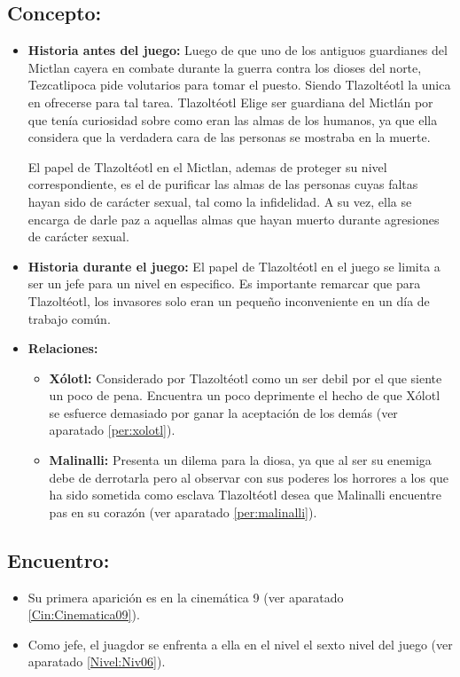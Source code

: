 \subsection{Concepto:}
\begin{itemize}
	\item \textbf{Historia antes del juego:}
	Luego de que uno de los antiguos guardianes del Mictlan cayera en combate durante la guerra contra los dioses del norte, Tezcatlipoca pide volutarios para tomar el puesto. Siendo Tlazoltéotl la unica en ofrecerse para tal tarea. Tlazoltéotl Elige ser guardiana del Mictlán por que tenía curiosidad sobre como eran las almas de los humanos, ya que ella considera que la verdadera cara de las personas se mostraba en la muerte.
	\\
	\par
	El papel de Tlazoltéotl en el Mictlan, ademas de proteger su nivel correspondiente, es el de purificar las almas de las personas cuyas faltas hayan sido de carácter sexual, tal como la infidelidad. A su vez, ella se encarga de darle paz a aquellas almas que hayan muerto durante agresiones de carácter sexual. 
	\item \textbf{Historia durante el juego:}
	El papel de  Tlazoltéotl en el juego se limita a ser un jefe para un nivel en especifico. Es importante remarcar que para  Tlazoltéotl, los invasores solo eran un pequeño inconveniente en un día de trabajo común.
	\item \textbf{Relaciones:}
	\begin{itemize}
		\item \textbf{Xólotl:} Considerado por Tlazoltéotl como un ser debil por el que siente un poco de pena. Encuentra un poco deprimente el hecho de que Xólotl se esfuerce demasiado por ganar la aceptación de los demás (ver aparatado \ref{per:xolotl}). 
		\item \textbf{Malinalli:} Presenta un dilema para la diosa, ya que al ser su enemiga debe de derrotarla pero al observar con sus poderes los horrores a los que ha sido sometida como esclava  Tlazoltéotl desea que Malinalli encuentre pas en su corazón (ver aparatado \ref{per:malinalli}).
	\end{itemize}                     
\end{itemize}

\subsection{Encuentro:}
\begin{itemize}
	\item Su primera aparición es en la cinemática 9 (ver aparatado \ref{Cin:Cinematica09}).
	\item Como jefe, el juagdor se enfrenta a ella en el nivel el sexto nivel del juego (ver aparatado \ref{Nivel:Niv06}).
\end{itemize} 

